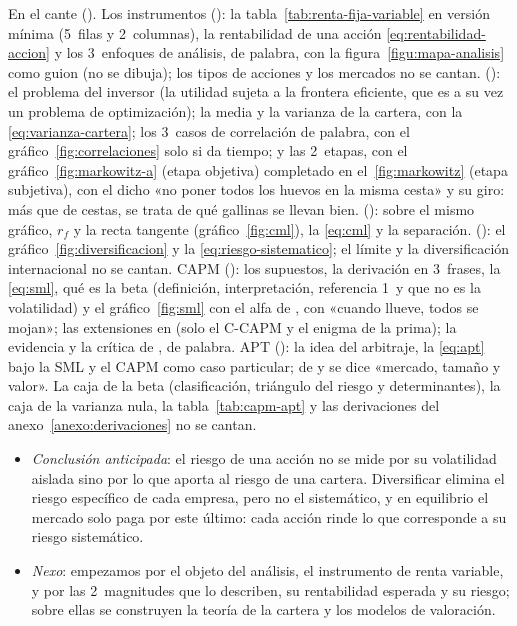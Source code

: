 \documentclass[11pt]{article}
\begin{document}
\begin{notaopositor}
En el cante (). Los instrumentos (): la tabla~\ref{tab:renta-fija-variable} en versión mínima (5~filas y 2~columnas), la rentabilidad de una acción \eqref{eq:rentabilidad-accion} y los 3~enfoques de análisis, de palabra, con la figura~\ref{figu:mapa-analisis} como guion (no se dibuja); los tipos de acciones y los mercados no se cantan.  (): el problema del inversor (la utilidad sujeta a la frontera eficiente, que es a su vez un problema de optimización); la media y la varianza de la cartera, con la \eqref{eq:varianza-cartera}; los 3~casos de correlación de palabra, con el gráfico~\ref{fig:correlaciones} solo si da tiempo; y las 2~etapas, con el gráfico~\ref{fig:markowitz-a} (etapa objetiva) completado en el~\ref{fig:markowitz} (etapa subjetiva), con el dicho «no poner todos los huevos en la misma cesta» y su giro: más que de cestas, se trata de qué gallinas se llevan bien.  (): sobre el mismo gráfico, $r_f$ y la recta tangente (gráfico~\ref{fig:cml}), la \eqref{eq:cml} y la separación.  (): el gráfico~\ref{fig:diversificacion} y la \eqref{eq:riesgo-sistematico}; el límite y la diversificación internacional no se cantan. CAPM (): los supuestos, la derivación en 3~frases, la \eqref{eq:sml}, qué es la beta (definición, interpretación, referencia 1~y que no es la volatilidad) y el gráfico~\ref{fig:sml} con el alfa de , con «cuando llueve, todos se mojan»; las extensiones en  (solo el C-CAPM y el enigma de la prima); la evidencia y la crítica de , de palabra. APT (): la idea del arbitraje, la \eqref{eq:apt} bajo la SML y el CAPM como caso particular; de  y  se dice «mercado, tamaño y valor». La caja de la beta (clasificación, triángulo del riesgo y determinantes), la caja de la varianza nula, la tabla~\ref{tab:capm-apt} y las derivaciones del anexo~\ref{anexo:derivaciones} no se cantan.
\end{notaopositor}

\begin{itemize}
\item \emph{Conclusión anticipada}: el riesgo de una acción no se mide por su volatilidad aislada sino por lo que aporta al riesgo de una cartera. Diversificar elimina el riesgo específico de cada empresa, pero no el sistemático, y en equilibrio el mercado solo paga por este último: cada acción rinde lo que corresponde a su riesgo sistemático.
\item \emph{Nexo}: empezamos por el objeto del análisis, el instrumento de renta variable, y por las 2~magnitudes que lo describen, su rentabilidad esperada y su riesgo; sobre ellas se construyen la teoría de la cartera y los modelos de valoración.
\end{itemize}
\end{document}
